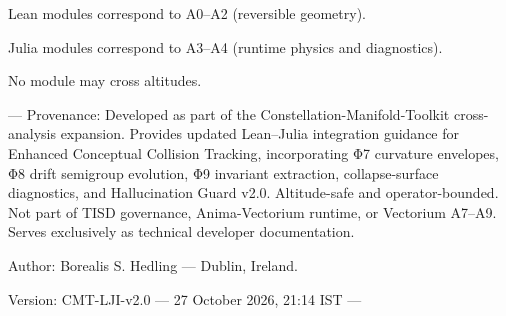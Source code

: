 Lean modules correspond to A0–A2 (reversible geometry).

Julia modules correspond to A3–A4 (runtime physics and diagnostics).

No module may cross altitudes.


---
Provenance:
Developed as part of the Constellation-Manifold-Toolkit cross-analysis expansion.
Provides updated Lean–Julia integration guidance for Enhanced Conceptual Collision
Tracking, incorporating Φ7 curvature envelopes, Φ8 drift semigroup evolution,
Φ9 invariant extraction, collapse-surface diagnostics, and Hallucination Guard v2.0.
Altitude-safe and operator-bounded. Not part of TISD governance, Anima-Vectorium
runtime, or Vectorium A7–A9. Serves exclusively as technical developer documentation.

Author:
Borealis S. Hedling — Dublin, Ireland.

Version:
CMT-LJI-v2.0 — 27 October 2026, 21:14 IST
---
